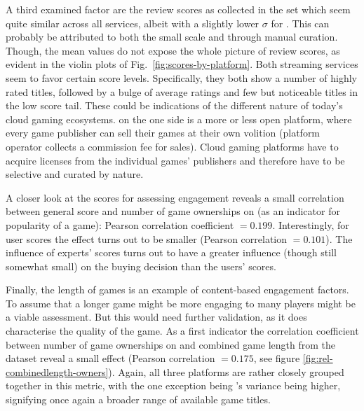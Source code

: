 A third examined factor are the review scores as collected in the \metacritic set which seem quite similar across all services, albeit with a slightly lower $\sigma$ for \gfnow. This can probably be attributed to both the small scale and through manual curation. Though, the mean values do not expose the whole picture of review scores, as evident in the violin plots of Fig.~\ref{fig:scores-by-platform}. Both streaming services seem to favor certain score levels. Specifically, they both show a number of highly rated titles, followed by a bulge of average ratings and few but noticeable titles in the low score tail. These could be indications of the different nature of today's cloud gaming ecosystems. \steam on the one side is a more or less open platform, where every game publisher can sell their games at their own volition (platform operator collects a commission fee for sales). Cloud gaming platforms have to acquire licenses from the individual games' publishers and therefore have to be selective and curated by nature. 

A closer look at the \metacritic scores for assessing engagement reveals a small correlation between general score and number of game ownerships on \steam (as an indicator for popularity of a game): Pearson correlation coefficient $= 0.199$. Interestingly, for \metacritic user scores the effect turns out to be smaller (Pearson correlation $= 0.101$). The influence of experts' scores turns out to have a greater influence (though still somewhat small) on the buying decision than the users' scores.

Finally, the length of games is an example of content-based engagement factors. To assume that a longer game might be more engaging to many players might be a viable assessment. But this would need further validation, as it does characterise the quality of the game. As a first indicator the correlation coefficient between number of game ownerships on \steam and combined game length from the \hltb dataset reveal a small effect (Pearson correlation $= 0.175$, see figure \ref{fig:rel-combinedlength-owners}). Again, all three platforms are rather closely grouped together in this metric, with the one exception being \steam's variance being higher, signifying once again a broader range of available game titles.



